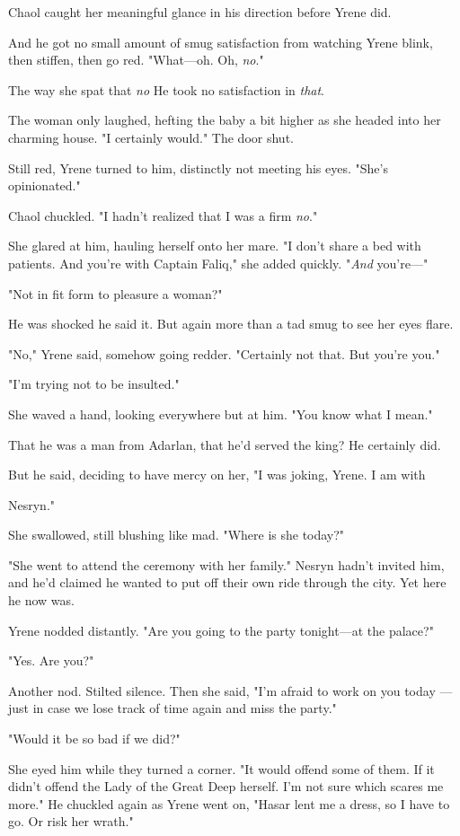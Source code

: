Chaol caught her meaningful glance in his direction before Yrene did.

And he got no small amount of smug satisfaction from watching Yrene blink, then stiffen, then go red. "What---oh. Oh, \emph{no}."

The way she spat that \emph{no}  He took no satisfaction in
\emph{that}.

The woman only laughed, hefting the baby a bit higher as she headed into her charming house. "I certainly would." The door shut.

Still red, Yrene turned to him, distinctly not meeting his eyes. "She's opinionated."

Chaol chuckled. "I hadn't realized that I was a firm \emph{no}."

She glared at him, hauling herself onto her mare. "I don't share a bed with patients. And you're with Captain Faliq," she added quickly. "\emph{And} you're---"

"Not in fit form to pleasure a woman?"

He was shocked he said it. But again more than a tad smug to see her eyes flare.

"No," Yrene said, somehow going redder. "Certainly not that. But you're  you."

"I'm trying not to be insulted."

She waved a hand, looking everywhere but at him. "You know what I mean."

That he was a man from Adarlan, that he'd served the king? He certainly did.

But he said, deciding to have mercy on her, "I was joking, Yrene. I
 am with

Nesryn."

She swallowed, still blushing like mad. "Where is she today?"

"She went to attend the ceremony with her family." Nesryn hadn't invited him, and he'd claimed he wanted to put off their own ride through the city. Yet here he now was.

Yrene nodded distantly. "Are you going to the party tonight---at the palace?"

"Yes. Are you?"

Another nod. Stilted silence. Then she said, "I'm afraid to work on you today ---just in case we lose track of time again and miss the party."

"Would it be so bad if we did?"

She eyed him while they turned a corner. "It would offend some of them. If it didn't offend the Lady of the Great Deep herself. I'm not sure which scares me more." He chuckled again as Yrene went on, "Hasar lent me a dress, so I have to go. Or risk her wrath."

